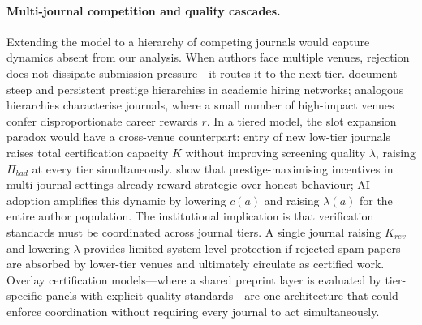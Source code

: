 \documentclass{article}
\begin{document}
\paragraph{Multi-journal competition and quality cascades.}
Extending the model to a hierarchy of competing journals would capture dynamics absent from our analysis.
When authors face multiple venues, rejection does not dissipate submission pressure---it routes it to the next tier.
\citet{Clauset2015} document steep and persistent prestige hierarchies in academic hiring networks; analogous hierarchies characterise journals, where a small number of high-impact venues confer disproportionate career rewards $r$.
In a tiered model, the slot expansion paradox would have a cross-venue counterpart: entry of new low-tier journals raises total certification capacity $K$ without improving screening quality $\lambda$, raising $\Pi_{bad}$ at every tier simultaneously.
\citet{Zollman2024} show that prestige-maximising incentives in multi-journal settings already reward strategic over honest behaviour; AI adoption amplifies this dynamic by lowering $c(a)$ and raising $\lambda(a)$ for the entire author population.
The institutional implication is that verification standards must be coordinated across journal tiers.
A single journal raising $K_{rev}$ and lowering $\lambda$ provides limited system-level protection if rejected spam papers are absorbed by lower-tier venues and ultimately circulate as certified work.
Overlay certification models---where a shared preprint layer is evaluated by tier-specific panels with explicit quality standards---are one architecture that could enforce coordination without requiring every journal to act simultaneously.
\end{document}
